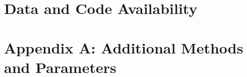 \documentclass[11pt]{article}
\begin{document}
%
%
%
%
%
%
%


\section*{Data and Code Availability}

\section*{Appendix A: Additional Methods and Parameters}

%
%
%
%
\end{document}
